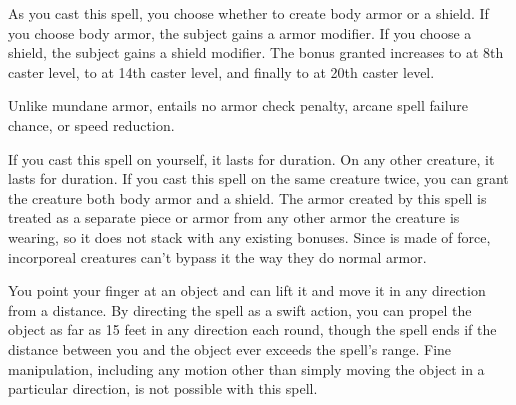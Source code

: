 \spelleffect As you cast this spell, you choose whether to create body armor or a shield. If you choose body armor, the subject gains a  armor modifier. If you choose a shield, the subject gains a  shield modifier. The bonus granted increases to  at 8th caster level, to  at 14th caster level, and finally to  at 20th caster level. 
\par Unlike mundane armor,  entails no armor check penalty, arcane spell failure chance, or speed reduction.
\par If you cast this spell on yourself, it lasts for \durlong duration. On any other creature, it lasts for \durshort duration.
\spellnotes If you cast this spell on the same creature twice, you can grant the creature both body armor and a shield. The armor created by this spell is treated as a separate piece or armor from any other armor the creature is wearing, so it does not stack with any existing bonuses. Since  is made of force, incorporeal creatures can't bypass it the way they do normal armor.

\spelldur{\durshort}
\spelleffect You point your finger at an object and can lift it and move it in any direction from a distance. By directing the spell as a swift action, you can propel the object as far as 15 feet in any direction each round, though the spell ends if the distance between you and the object ever exceeds the spell's range.
\spellnotes Fine manipulation, including any motion other than simply moving the object in a particular direction, is not possible with this spell.

